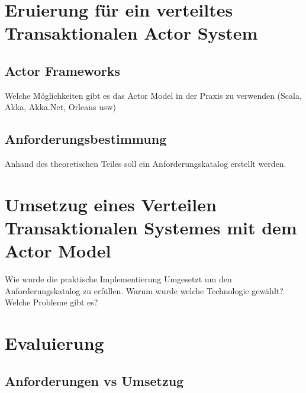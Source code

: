 \chapter{Eruierung für ein verteiltes Transaktionalen Actor System }
\section{Actor Frameworks}\label{sec:ActorFrameworks}
Welche Möglichkeiten gibt es das Actor Model in der Praxis zu verwenden (Scala, Akka, Akka.Net, Orleans usw)

\section{Anforderungsbestimmung}
Anhand des theoretischen Teiles soll ein Anforderungskatalog erstellt werden.

\chapter{Umsetzug eines Verteilen Transaktionalen Systemes mit dem Actor Model}
Wie wurde die praktische Implementierung Umgesetzt um den Anforderungskatalog zu erfüllen. Warum wurde welche Technologie gewählt? Welche Probleme gibt es? 

\chapter{Evaluierung}
\section{Anforderungen vs Umsetzug}

